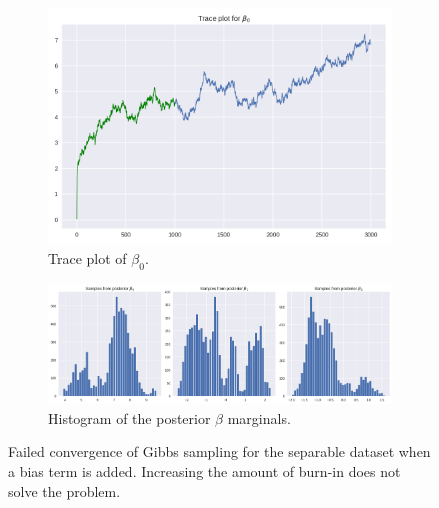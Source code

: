 \documentclass[11pt]{article}
\begin{document}
\begin{figure}
	\centering
	\begin{subfigure}[t]{.66\linewidth}
	\includegraphics[width=\linewidth]{images/separable_traceplot_fail.png}
	\caption{Trace plot of $\beta_0$.}	
	\end{subfigure}
	\begin{subfigure}[t]{.66\linewidth}
	\includegraphics[width=\linewidth]{images/separable_fail_posteriorhist.png}
	\caption{Histogram of the posterior $\beta$ marginals.}	
	\end{subfigure}
	\caption{Failed convergence of Gibbs sampling for the separable dataset when a bias term is added. Increasing the amount of burn-in does not solve the problem.}\label{fig:CompleteSeparFailedConv}
\end{figure}
\end{document}
